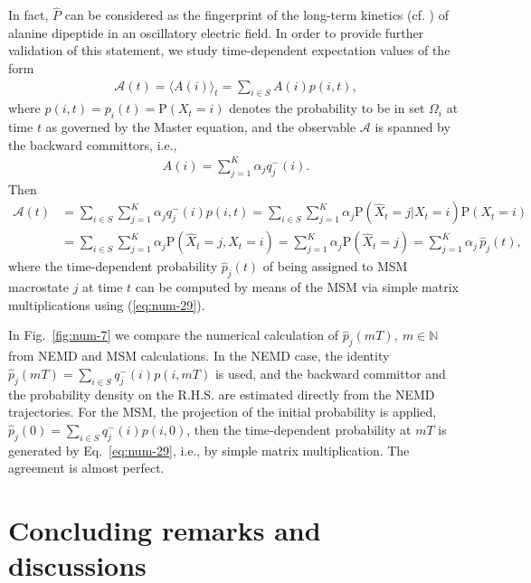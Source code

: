\documentclass[aps, pre, preprint,unsortedaddress,a4paper,onecolumn]{revtex4}
\newcommand{\recheck}[1]{{\color{red} #1}}
\newcommand{\bwd}[0]{-}
\newcommand{\prob}{\textrm{P}}
\begin{document}
In fact, $\hat{P}$ can be considered as the fingerprint of the long-term kinetics (cf. \cite{A19-39,PrinzKellerNoe_PCCP11_Perspective}) of alanine dipeptide in an oscillatory electric field.
In order to provide further validation of this statement, we study  time-dependent expectation values of
the form
\begin{align}
  \mathcal A(t) = \langle A(i)\rangle_t = \sum_{i\in S} A(i) p(i,t),
\end{align}
where $p(i,t) = p_i(t)=\prob(X_t=i)$ denotes the probability to be in set $\Omega_i$ at time $t$ as governed by the Master equation, and the observable $\mathcal A$ is spanned by the backward
committors, i.e.,
\begin{align}\label{A}
  A(i) = \sum_{j=1}^K \alpha_j q^\bwd_j(i).
\end{align}
Then
\begin{align}\nonumber
  \mathcal A(t) &=
  \sum_{i\in S} \sum_{j=1}^K \alpha_j q^\bwd_j(i)  p(i,t)=\sum_{i\in S} \sum_{j=1}^K \alpha_j \prob (\hat X_t = j \vert X_t = i) \prob (X_t = i) \\
  & =
  \sum_{i\in S} \sum_{j=1}^K \alpha_j \prob (\hat X_t = j ,X_t = i)  =
  \sum_{j=1}^K \alpha_j \prob (\hat X_t = j) 
 =
   \sum_{j=1}^K \alpha_j \,\hat p_j (t), \label{eq:num-28}
\end{align}
where the time-dependent probability $\hat{p}_j(t)$ of being assigned to MSM macrostate $j$ at time $t$ can be computed  by means of the MSM via simple matrix multiplications using (\ref{eq:num-29}).

In Fig.~\ref{fig:num-7} we compare the numerical calculation of $\hat p_j (mT), \ m\in\mathbb N$ from NEMD and MSM calculations.
\recheck{In the NEMD case, the identity  $\hat p_j (mT) = \sum_{i\in S}  q^\bwd_j(i)  p(i,mT) $ is used, and
the backward committor and the probability density on the R.H.S.
are estimated directly from the
NEMD trajectories.} For the MSM, the projection of the initial probability is applied, $\hat p_j (0) = \sum_{i\in S}  q^\bwd_j(i)  p(i,0) $, then
the time-dependent probability at $mT$ is generated by Eq.~\eqref{eq:num-29}, i.e., by simple matrix multiplication. The agreement is almost perfect.


\section{Concluding remarks and discussions}
\end{document}
